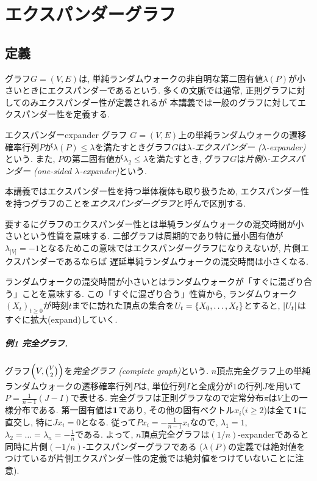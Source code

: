 \chapter{エクスパンダーグラフ} \label{chap:expander graph}
\section{定義}
グラフ$G=(V,E)$は, 単純ランダムウォークの非自明な第二固有値$\lambda(P)$が小さいときにエクスパンダーであるという.
多くの文脈では通常, 正則グラフに対してのみエクスパンダー性が定義されるが
本講義では一般のグラフに対してエクスパンダー性を定義する.
\begin{definition}{エクスパンダー}{expander}
    グラフ $G=(V,E)$上の単純ランダムウォークの遷移確率行列$P$が$\lambda(P) \le \lambda$を満たすときグラフ$G$は\emph{$\lambda$-エクスパンダー ($\lambda$-expander)}という.
    また, $P$の第二固有値が$\lambda_2 \le \lambda$を満たすとき, グラフ$G$は\emph{片側$\lambda$-エクスパンダー (one-sided $\lambda$-expander)}という.
\end{definition}
本講義ではエクスパンダー性を持つ単体複体も取り扱うため,
エクスパンダー性を持つグラフのことを\emph{エクスパンダーグラフ}と呼んで区別する.

要するにグラフのエクスパンダー性とは単純ランダムウォークの混交時間が小さいという性質を意味する.
二部グラフは周期的であり特に最小固有値が$\lambda_{|V|}=-1$となるためこの意味ではエクスパンダーグラフになりえないが,
片側エクスパンダーであるならば
遅延単純ランダムウォークの混交時間は小さくなる.

ランダムウォークの混交時間が小さいとはランダムウォークが「すぐに混ざり合う」ことを意味する.
この「すぐに混ざり合う」性質から, ランダムウォーク$(X_t)_{t\ge 0}$が時刻$t$までに訪れた頂点の集合を$U_t = \cbra*{X_0,\dots,X_t}$とすると, $\abs{U_t}$はすぐに拡大(expand)していく.

\paragraph*{例1 完全グラフ.}
グラフ$\rbra*{V, \binom{V}{2}}$を\emph{完全グラフ (complete graph)}という.
$n$頂点完全グラフ上の単純ランダムウォークの遷移確率行列$P$は, 単位行列$I$と全成分が$1$の行列$J$を用いて
$P = \frac{1}{n-1}(J-I)$で表せる.
完全グラフは正則グラフなので定常分布$\pi$は$V$上の一様分布である.
第一固有値は$\allone$であり,
その他の固有ベクトル$x_i$($i\ge 2$)は全て$\allone$に直交し, 特に$Jx_i = 0$となる.
従って$P x_i = -\frac{1}{n-1}x_i$なので, $\lambda_1=1$, $\lambda_2=\dots=\lambda_n = -\frac{1}{n}$である.
よって, $n$頂点完全グラフは$(1/n)$-expanderであると同時に片側$(-1/n)$-エクスパンダーグラフである
($\lambda(P)$の定義では絶対値をつけているが片側エクスパンダー性の定義では絶対値をつけていないことに注意).
%
